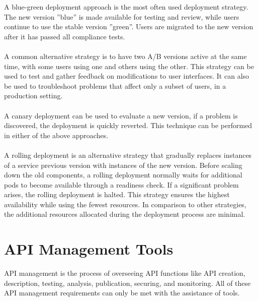 A blue-green deployment approach is the most often used deployment strategy.
The new version ''blue'' is made available for testing and review, while users continue to use the stable version ''green''.
Users are migrated to the new version after it has passed all compliance tests.

\paragraph{}

A common alternative strategy is to have two A/B versions active at the same time, with some users using one and others using the other.
This strategy can be used to test and gather feedback on modifications to user interfaces.
It can also be used to troubleshoot problems that affect only a subset of users, in a production setting.

\paragraph{}

A canary deployment can be used to evaluate a new version, if a problem is discovered, the deployment is quickly reverted.
This technique can be performed in either of the above approaches.

\paragraph{}

A rolling deployment is an alternative strategy that gradually replaces instances of a service previous version with instances of the new version.
Before scaling down the old components, a rolling deployment normally waits for additional pods to become available through a readiness check.
If a significant problem arises, the rolling deployment is halted.
This strategy ensures the highest availability while using the fewest resources.
In comparison to other strategies, the additional resources allocated during the deployment process are minimal.

\section{API Management Tools} %
\label{sec:api_management_tools}

API management is the process of overseeing API functions like API creation, description, testing, analysis, publication, securing, and monitoring.
All of these API management requirements can only be met with the assistance of tools.

